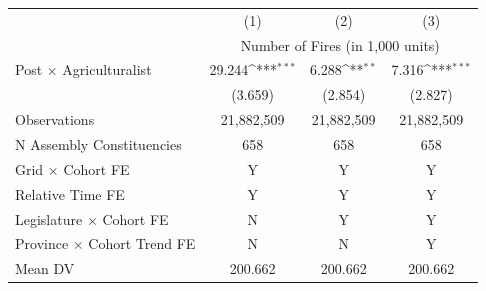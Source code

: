 {
\def\sym#1{\ifmmode^{#1}\else\(^{#1}\)\fi}
\begin{tabular}{l*{3}{c}}
\hline
            &\multicolumn{1}{c}{(1)}         &\multicolumn{1}{c}{(2)}         &\multicolumn{1}{c}{(3)}         \\
            & \multicolumn{3}{c}{Number of Fires (in 1,000 units) } \\ \hline

Post $\times$ Agriculturalist&      29.244\sym{***}&       6.288\sym{**} &       7.316\sym{***}\\
            &     (3.659)         &     (2.854)         &     (2.827)         \\
\hline
Observations&  21,882,509         &  21,882,509         &  21,882,509         \\
N Assembly Constituencies&         658         &         658         &         658         \\
Grid $\times$ Cohort FE&           Y         &           Y         &           Y         \\
Relative Time FE&           Y         &           Y         &           Y         \\
Legislature  $\times$ Cohort FE&           N         &           Y         &           Y         \\
Province  $\times$ Cohort Trend FE&           N         &           N         &           Y         \\
Mean DV     &     200.662         &     200.662         &     200.662         \\
\hline
\end{tabular}
}

